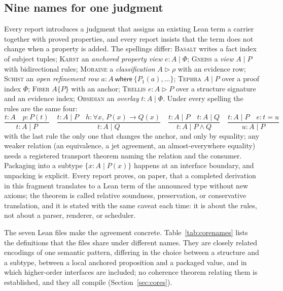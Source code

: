 \documentclass[11pt,a4paper]{article}
\newcommand{\Bs}{\textsc{Basalt}}
\newcommand{\Fb}{\textsc{Fiber}}
\newcommand{\Gn}{\textsc{Gneiss}}
\newcommand{\Ks}{\textsc{Karst}}
\newcommand{\Mr}{\textsc{Moraine}}
\newcommand{\Ob}{\textsc{Obsidian}}
\newcommand{\Sc}{\textsc{Schist}}
\newcommand{\Tp}{\textsc{Tephra}}
\newcommand{\Tr}{\textsc{Trellis}}
\theoremstyle{definition}
\begin{document}
\subsection{Nine names for one judgment}
Every report introduces a judgment that assigns an existing Lean term a carrier together with proved properties, and every report insists that the term does not change when a property is added. The spellings differ: \Bs{} writes a fact index of subject tuples; \Ks{} an \emph{anchored property view} $e:A\mid\Phi$; \Gn{} a \emph{view} $A\mid P$ with bidirectional rules; \Mr{} a \emph{classification} $A\triangleright\rho$ with an evidence row; \Sc{} an \emph{open refinement row} $a:A\ \mathsf{where}\ \{P_1(a),\dots\}$; \Tp{} $A\mid P$ over a proof index $\Phi$; \Fb{} $A\{P\}$ with an anchor; \Tr{} $e:A\triangleright P$ over a structure signature and an evidence index; \Ob{} an \emph{overlay} $t:A\mid\Phi$. Under every spelling the rules are the same four:
\[
\frac{t:A\quad p:P(t)}{t:A\mid P}\quad
\frac{t:A\mid P\quad h:\forall x,\,P(x)\to Q(x)}{t:A\mid Q}\quad
\frac{t:A\mid P\quad t:A\mid Q}{t:A\mid P\wedge Q}\quad
\frac{t:A\mid P\quad e:t=u}{u:A\mid P}
\]
with the last rule the only one that changes the anchor, and only by equality; any weaker relation (an equivalence, a jet agreement, an almost-everywhere equality) needs a registered transport theorem naming the relation and the consumer. Packaging into a subtype $\{x:A\mid P(x)\}$ happens at an interface boundary, and unpacking is explicit. Every report proves, on paper, that a completed derivation in this fragment translates to a Lean term of the announced type without new axioms; the theorem is called relative soundness, preservation, or conservative translation, and it is stated with the same caveat each time: it is about the rules, not about a parser, renderer, or scheduler.

The seven Lean files make the agreement concrete. Table~\ref{tab:corenames} lists the definitions that the files share under different names. They are closely related encodings of one semantic pattern, differing in the choice between a structure and a subtype, between a local anchored proposition and a packaged value, and in which higher-order interfaces are included; no coherence theorem relating them is established, and they all compile (Section~\ref{sec:cores}).
\end{document}
